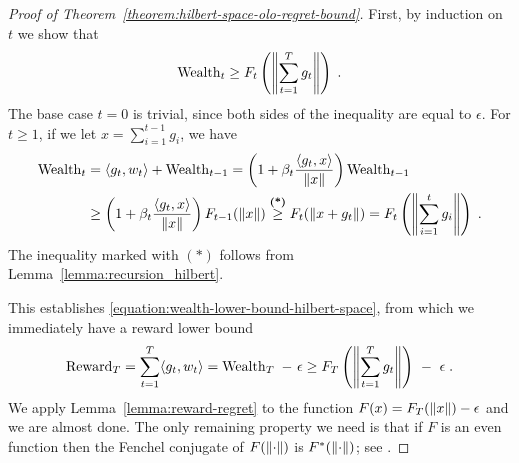 \begin{proof}[Proof of Theorem~\ref{theorem:hilbert-space-olo-regret-bound}]
First, by induction on $t$ we show that
\begin{equation}
\label{equation:wealth-lower-bound-hilbert-space}
\operatorname{Wealth}_t \ge F_t\left(\left\|{\sum_{t=1}^T g_t}\right\| \right) \; .
\end{equation}
The base case $t=0$ is trivial, since both sides of the inequality are equal to
$\epsilon$.  For $t \ge 1$, if we let $x = \sum_{i=1}^{t-1} g_i$, we have
\begin{align*}
\operatorname{Wealth}_t
&= \langle g_t, w_t \rangle + \operatorname{Wealth}_{t-1}
= \left(1 + \beta_t \frac{\langle g_t, x \rangle}{\left\|{x}\right\|} \right) \operatorname{Wealth}_{t-1} \\
&\ge \left(1 + \beta_t \frac{\langle g_t, x \rangle}{\left\|{x}\right\|} \right) F_{t-1}(\left\|{x}\right\|)
\stackrel{\text{\textbf{(*)}}}{\ge} F_t(\left\|{x + g_t}\right\|)
= F_t\left(\left\|{\sum_{i=1}^t g_i}\right\| \right) \; .
\end{align*}
The inequality marked with $(*)$ follows from
Lemma~\ref{lemma:recursion_hilbert}.

This establishes \eqref{equation:wealth-lower-bound-hilbert-space},
from which we immediately have a reward lower bound
\begin{equation}
\label{equation:hilbert-space-olo-reward-lower-bound}
\operatorname{Reward}_T
= \sum_{t=1}^T \langle g_t, w_t \rangle
= \operatorname{Wealth}_T \ - \ \epsilon
\ge F_T\left(\left\|{\sum_{t=1}^T g_t}\right\| \right) \ - \ \epsilon \; .
\end{equation}
We apply Lemma~\ref{lemma:reward-regret} to the function $F(x) = F_T(\left\|{x}\right\|) -
\epsilon$ and we are almost done. The only remaining property we need is that if
$F$ is an even function then the Fenchel conjugate of $F(\left\|{\cdot}\right\|)$ is
$F^*(\left\|{\cdot}\right\|)$; see \citet[Example 13.7]{Bauschke-Combettes-2011}.
\end{proof}
